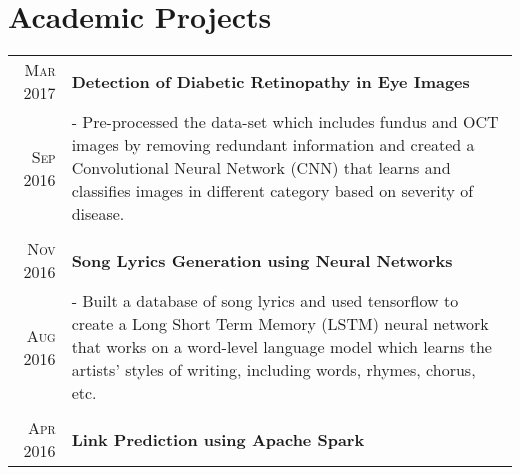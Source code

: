 \documentclass[a4paper,10pt]{extarticle} %
\begin{document}
\section{\large{Academic Projects}}

\begin{tabular}{r|p{16cm}}


\textsc{\normalsize{Mar 2017}} & \textbf{\normalsize{Detection of Diabetic Retinopathy in Eye Images}}\\
\textsc{\normalsize{Sep 2016}} & \footnotesize{- Pre-processed the data-set which includes fundus and OCT images by removing redundant information and created a Convolutional Neural Network (CNN) that learns and classifies images in different category based on severity of disease. }\\
\multicolumn{2}{c}{} \\

\textsc{\normalsize{Nov 2016}} & \textbf{\normalsize{Song Lyrics Generation using Neural Networks}}\\
\textsc{\normalsize{Aug 2016}} & \footnotesize{- Built a database of song lyrics and used tensorflow to create a Long Short Term Memory (LSTM) neural network that works on a word-level language model which learns the artists’ styles of writing, including words, rhymes, chorus, etc. }\\
\multicolumn{2}{c}{} \\

\textsc{\normalsize{Apr 2016}} & \textbf{\normalsize{Link Prediction using Apache Spark}} \\


\end{tabular}
\end{document}
